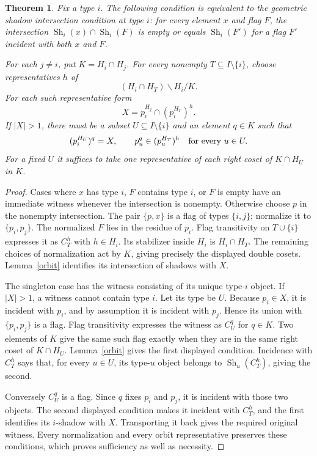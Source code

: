 \documentclass[11pt]{article}
\newtheorem{theorem}{Theorem}
\newcommand{\Sh}{\operatorname{Sh}}
\begin{document}
\begin{theorem}\label{shadowtest}
Fix a type $i$. The following condition is equivalent to the geometric
shadow intersection condition at type $i$: for every element $x$ and flag
$F$, the intersection $\Sh_i(x)\cap\Sh_i(F)$ is empty or equals
$\Sh_i(F')$ for a flag $F'$ incident with both $x$ and $F$.

For each $j\ne i$, put $K=H_i\cap H_j$. For every nonempty
$T\subseteq I\setminus\{i\}$, choose representatives $h$ of
\[
                  (H_i\cap H_T)\backslash H_i/K.
\]
For each such representative form
\[
                  X=p_i^{H_j}\cap(p_i^{H_T})^h.
\]
If $|X|>1$, there must be a subset $U\subseteq I\setminus\{i\}$
and an element $q\in K$ such that
\[
 (p_i^{H_U})^q=X,
 \qquad p_u^q\in(p_u^{H_T})^h\quad\hbox{for every }u\in U.
\]
For a fixed $U$ it suffices to take one representative of each right
coset of $K\cap H_U$ in $K$.
\end{theorem}
\begin{proof}
Cases where $x$ has type $i$, $F$ contains type $i$, or $F$ is empty have
an immediate witness whenever the intersection is nonempty. Otherwise
choose $p$ in the nonempty intersection. The pair $\{p,x\}$ is a flag of
types $\{i,j\}$; normalize it to $\{p_i,p_j\}$. The normalized $F$ lies
in the residue of $p_i$. Flag transitivity on $T\cup\{i\}$ expresses it
as $C_T^h$ with $h\in H_i$. Its stabilizer inside $H_i$ is $H_i\cap H_T$.
The remaining choices of normalization act by $K$, giving precisely the
displayed double cosets. Lemma~\ref{orbit} identifies its intersection
of shadows with $X$.

The singleton case has the witness consisting of its unique type-$i$
object. If $|X|>1$, a witness cannot contain type $i$. Let its type be
$U$. Because $p_i\in X$, it is incident with $p_i$, and by assumption it
is incident with $p_j$. Hence its union with $\{p_i,p_j\}$ is a flag.
Flag transitivity expresses the witness as $C_U^q$ for $q\in K$.
Two elements of $K$ give the same such flag exactly when they are in
the same right coset of $K\cap H_U$. Lemma~\ref{orbit} gives the first
displayed condition. Incidence with $C_T^h$ says that, for every $u\in U$,
its type-$u$ object belongs to $\Sh_u(C_T^h)$, giving the second.

Conversely $C_U^q$ is a flag. Since $q$ fixes $p_i$ and $p_j$, it is
incident with those two objects. The second displayed condition makes
it incident with $C_T^h$, and the first identifies its $i$-shadow with
$X$. Transporting it back gives the required original witness. Every
normalization and every orbit representative preserves these conditions,
which proves sufficiency as well as necessity.
\end{proof}
\end{document}
